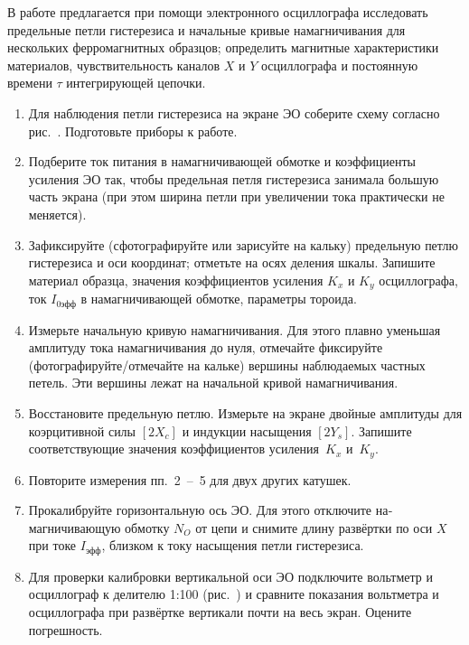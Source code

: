 \begin{lab:task}

В работе предлагается при помощи электронного осциллографа
исследовать предельные петли гистерезиса и
начальные кривые намагничивания для нескольких ферромагнитных образцов;
определить магнитные характеристики материалов, чувствительность каналов $X$ и
$Y$ осциллографа и постоянную времени $\tau$ интегрирующей цепочки.

\begin{enumerate}
\item
Для наблюдения петли гистерезиса на экране ЭО соберите схему согласно
рис.~. Подготовьте приборы к работе.

\item
Подберите ток питания в намагничивающей обмотке и коэффициен­ты усиления ЭО так,
чтобы предельная петля гистерезиса занимала большую часть экрана (при этом
ширина петли при увеличении тока практически не меняется).

\item
Зафиксируйте (сфотографируйте или зарисуйте на кальку)
предельную петлю гистерезиса и оси координат; отметьте на осях деления
шкалы. Запишите материал образца, значения коэффициентов усиления
$K_x$ и $K_y$ осциллографа, ток $I_\text{0эфф}$ в намагничивающей обмотке,
параметры тороида.

\item
Измерьте начальную кривую намагничивания. Для этого плавно уменьшая амплитуду тока
намагничивания до нуля, отмечайте фиксируйте
(фотографируйте/отмечайте на кальке) вершины наблюдаемых частных петель.
Эти вершины лежат на начальной кривой намагничи­вания.

\item
Восстановите предельную петлю. Измерьте на экране
двойные амплитуды для коэрцитивной силы $[2X_c]$ и индукции насыщения
$[2Y_s]$. Запишите соответствующие значения коэффициентов
усиления~$K_x$ и~$K_y$.

\item
Повторите измерения пп.~2~--~5 для двух других катушек.

\item
Прокалибруйте горизонтальную ось ЭО. Для этого отключите на­магничивающую
обмотку $N_O$ от цепи и снимите длину развёртки по оси $X$ при токе
$I_\text{эфф}$, близком к току насыщения петли гистерезиса.

\item
Для проверки калибровки вертикальной оси ЭО подключите вольтметр и осциллограф к
делителю 1:100 (рис.~) и сравните показания
вольтметра и осциллографа при развёртке вертикали почти на весь экран. Оцените
погрешность.


\end{enumerate}
\end{lab:task}
